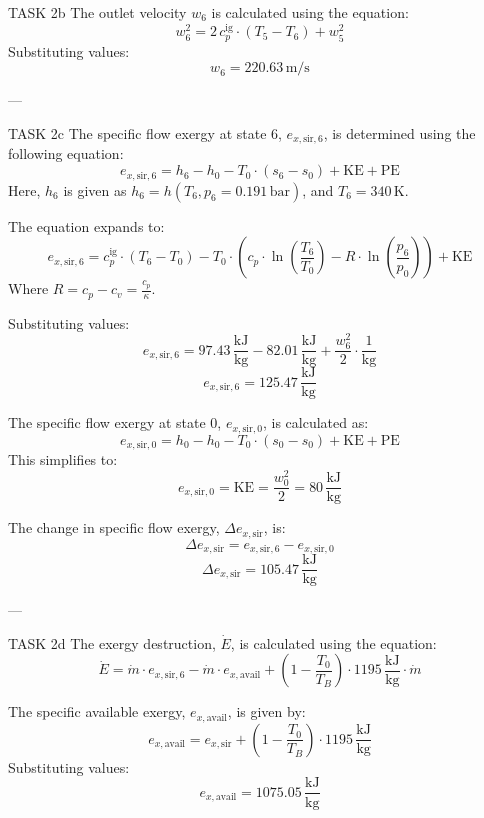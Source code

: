 TASK 2b  
The outlet velocity \( w_6 \) is calculated using the equation:  
\[
w_6^2 = 2 \, c_p^{\text{ig}} \cdot (T_5 - T_6) + w_5^2
\]  
Substituting values:  
\[
w_6 = 220.63 \, \text{m/s}
\]  

---

TASK 2c  
The specific flow exergy at state 6, \( e_{x,\text{sir},6} \), is determined using the following equation:  
\[
e_{x,\text{sir},6} = h_6 - h_0 - T_0 \cdot (s_6 - s_0) + \text{KE} + \text{PE}
\]  
Here, \( h_6 \) is given as \( h_6 = h(T_6, p_6 = 0.191 \, \text{bar}) \), and \( T_6 = 340 \, \text{K} \).  

The equation expands to:  
\[
e_{x,\text{sir},6} = c_p^{\text{ig}} \cdot (T_6 - T_0) - T_0 \cdot \left( c_p \cdot \ln\left(\frac{T_6}{T_0}\right) - R \cdot \ln\left(\frac{p_6}{p_0}\right) \right) + \text{KE}
\]  
Where \( R = c_p - c_v = \frac{c_p}{\kappa} \).  

Substituting values:  
\[
e_{x,\text{sir},6} = 97.43 \, \frac{\text{kJ}}{\text{kg}} - 82.01 \, \frac{\text{kJ}}{\text{kg}} + \frac{w_6^2}{2} \cdot \frac{1}{\text{kg}}
\]  
\[
e_{x,\text{sir},6} = 125.47 \, \frac{\text{kJ}}{\text{kg}}
\]  

The specific flow exergy at state 0, \( e_{x,\text{sir},0} \), is calculated as:  
\[
e_{x,\text{sir},0} = h_0 - h_0 - T_0 \cdot (s_0 - s_0) + \text{KE} + \text{PE}
\]  
This simplifies to:  
\[
e_{x,\text{sir},0} = \text{KE} = \frac{w_0^2}{2} = 80 \, \frac{\text{kJ}}{\text{kg}}
\]  

The change in specific flow exergy, \( \Delta e_{x,\text{sir}} \), is:  
\[
\Delta e_{x,\text{sir}} = e_{x,\text{sir},6} - e_{x,\text{sir},0}
\]  
\[
\Delta e_{x,\text{sir}} = 105.47 \, \frac{\text{kJ}}{\text{kg}}
\]  

---

TASK 2d  
The exergy destruction, \( \dot{E} \), is calculated using the equation:  
\[
\dot{E} = \dot{m} \cdot e_{x,\text{sir},6} - \dot{m} \cdot e_{x,\text{avail}} + \left(1 - \frac{T_0}{T_B}\right) \cdot 1195 \, \frac{\text{kJ}}{\text{kg}} \cdot \dot{m}
\]  

The specific available exergy, \( e_{x,\text{avail}} \), is given by:  
\[
e_{x,\text{avail}} = e_{x,\text{sir}} + \left(1 - \frac{T_0}{T_B}\right) \cdot 1195 \, \frac{\text{kJ}}{\text{kg}}
\]  
Substituting values:  
\[
e_{x,\text{avail}} = 1075.05 \, \frac{\text{kJ}}{\text{kg}}
\]